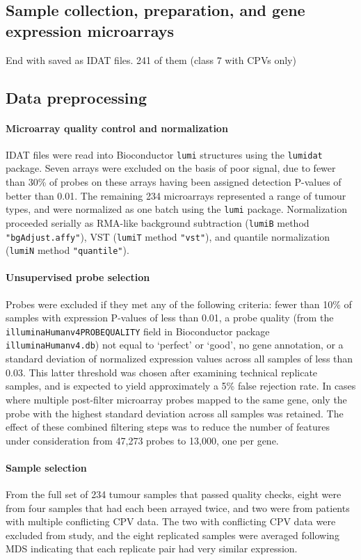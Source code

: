 \documentclass[thesis.tex]{subfiles}
\begin{document}
\subsection{Sample collection, preparation, and gene expression microarrays}
\mpfatal{}
End with saved as \gls{IDAT} files.  241 of them (class 7 with CPVs only)

\subsection{Data preprocessing}
\paragraph{Microarray quality control and normalization}
\gls{IDAT} files were read into Bioconductor \texttt{lumi} structures using the \texttt{lumidat} package.  Seven arrays were excluded on the basis of poor signal, due to fewer than 30\% of probes on these arrays having been assigned detection P-values of better than 0.01.  The remaining 234 microarrays represented a range of tumour types, and were normalized as one batch using the \texttt{lumi} package.  Normalization proceeded serially as RMA-like background subtraction (\texttt{lumiB} method \texttt{"bgAdjust.affy"}), VST (\texttt{lumiT} method \texttt{"vst"}), and quantile normalization (\texttt{lumiN} method \texttt{"quantile"}).
\paragraph{Unsupervised probe selection}
Probes were excluded if they met any of the following criteria: fewer than 10\% of samples with expression P-values of less than 0.01, a probe quality (from the \texttt{illuminaHumanv4PROBEQUALITY} field in Bioconductor package \texttt{illuminaHumanv4.db}) not equal to `perfect' or `good', no gene annotation, or a standard deviation of normalized expression values across all samples of less than 0.03.  This latter threshold was chosen after examining technical replicate samples, and is expected to yield approximately a 5\% false rejection rate.  In cases where multiple post-filter microarray probes mapped to the same gene, only the probe with the highest standard deviation across all samples was retained.  The effect of these combined filtering steps was to reduce the number of features under consideration from 47,273 probes to 13,000, one per gene.  \paragraph{Sample selection}  From the full set of 234 tumour samples that passed quality checks, eight were from four samples that had each been arrayed twice, and two were from patients with multiple conflicting \gls{CPV} data.  The two with conflicting \gls{CPV} data were excluded from study, and the eight replicated samples were averaged following \gls{MDS} indicating that each replicate pair had very similar expression.
\end{document}
